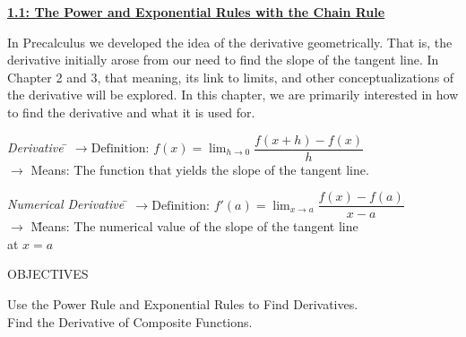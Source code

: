 \textbf{\underline{\large{1.1: The Power and Exponential Rules with the Chain Rule}}} \par

In Precalculus we developed the idea of the derivative geometrically. That is, the derivative initially arose from our need to find the slope of the tangent line. In Chapter 2 and 3, that meaning, its link to limits, and other conceptualizations of the derivative will be explored. In this chapter, we are primarily interested in how to find the derivative and what it is used for. \par

\begin{tcolorbox}[definition]
    \begin{tabbing}
        \textit{Derivative} \= $\rightarrow \text{Definition: } f(x) = \lim_{h \to 0} \dfrac{f(x + h) - f(x)}{h}$ \\[5.5pt]
        \> $\rightarrow$ {Means:  The function that yields the slope of the tangent line.}
\end{tabbing} \vspace{11pt}
\begin{tabbing}
    \textit{Numerical Derivative} \= $\rightarrow \text{Definition: } f'(a) = \lim_{x \to a} \dfrac{f(x) - f(a)}{x - a}$ \\[5.5pt]
    \> $\rightarrow$ \= Means: The numerical value of the slope of the tangent line \\
    \> \> at $x = a$ 
\end{tabbing}
\end{tcolorbox}

\begin{center}  
\end{center}

\begin{tcolorbox}[objective]
    \begin{center}
        OBJECTIVES \\[11pt]
    \end{center}
    Use the Power Rule and Exponential Rules to Find Derivatives. \\
    Find the Derivative of Composite Functions. 
\end{tcolorbox}



